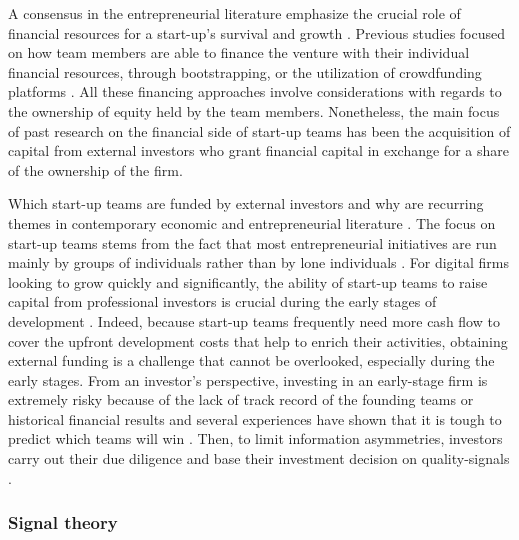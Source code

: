 \documentclass[12pt]{article}
\begin{document}
A consensus in the entrepreneurial literature emphasize the crucial role of financial resources for a start-up's survival and growth \citep{cooper1994initial}. Previous studies focused on how team members are able to finance the venture with their individual financial resources, through bootstrapping, or the utilization of crowdfunding platforms \citep{drover2017review, klein2020start}. All these financing approaches involve considerations with regards to the ownership of equity held by the team members. Nonetheless, the main focus of past research on the financial side of start-up teams has been the acquisition of capital from external investors who grant financial capital in exchange for a share of the ownership of the firm.

Which start-up teams are funded by external investors and why are recurring themes in contemporary economic and entrepreneurial literature \citep{baum2004picking, beckman2007early, bernstein2017attracting, franke2006you, franke2008venture, plummer2016better, kaplan2009should, shane2002network}. The focus on start-up teams stems from the fact that most entrepreneurial initiatives are run mainly by groups of individuals rather than by lone individuals \citep{klotz2014new}. For digital firms looking to grow quickly and significantly, the ability of start-up teams to raise capital from professional investors is crucial during the early stages of development \citep{rosenbusch2013does}. Indeed, because start-up teams frequently need more cash flow to cover the upfront development costs that help to enrich their activities, obtaining external funding is a challenge that cannot be overlooked, especially during the early stages. From an investor's perspective, investing in an early-stage firm is extremely risky because of the lack of track record of the founding teams or historical financial results and several experiences have shown that it is tough to predict which teams will win \citep{ghassemiautomated, duhigg2016google}. Then, to limit information asymmetries, investors carry out their due diligence and base their investment decision on quality-signals \citep{spence1978job, ko2018signaling}.

\subsubsection{Signal theory}
\end{document}
